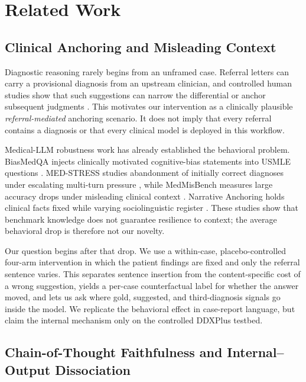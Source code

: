 
\section{Related Work}
\label{sec:related}

\subsection{Clinical Anchoring and Misleading Context}
\label{sec:related-anchoring}

Diagnostic reasoning rarely begins from an unframed case. Referral letters
can carry a provisional diagnosis from an upstream clinician, and controlled
human studies show that such suggestions can narrow the differential or
anchor subsequent judgments \cite{spaanjaars2015referral, staal2022referral}.
This motivates our intervention as a clinically plausible
\emph{referral-mediated} anchoring scenario. It does not imply that every
referral contains a diagnosis or that every clinical model is deployed in
this workflow.

Medical-LLM robustness work has already established the behavioral problem.
BiasMedQA injects clinically motivated cognitive-bias statements into USMLE
questions \cite{schmidgall2024biasmedqa}. MED-STRESS studies abandonment of
initially correct diagnoses under escalating multi-turn pressure
\cite{xiao2026medstress}, while MedMisBench measures large accuracy drops
under misleading clinical context \cite{zhou2026medmisbench}. Narrative
Anchoring holds clinical facts fixed while varying sociolinguistic register
\cite{singh2026narrative}. These studies show that benchmark knowledge does
not guarantee resilience to context; the average behavioral drop is
therefore not our novelty.

Our question begins after that drop. We use a within-case,
placebo-controlled four-arm intervention in which the patient findings are
fixed and only the referral sentence varies. This separates sentence
insertion from the content-specific cost of a wrong suggestion, yields a
per-case counterfactual label for whether the answer moved, and lets us ask
where gold, suggested, and third-diagnosis signals go inside the model. We
replicate the behavioral effect in case-report language, but claim the
internal mechanism only on the controlled DDXPlus testbed.

\subsection{Chain-of-Thought Faithfulness and Internal--Output Dissociation}
\label{sec:related-dissociation}

